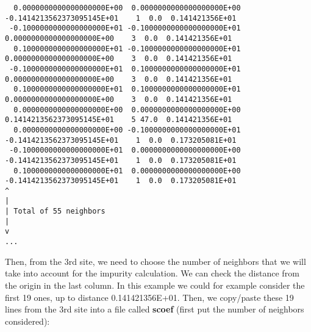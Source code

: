 \documentclass[a4paper,10pt,fullpage]{report}
\begin{document}
\begin{verbatim}
  0.0000000000000000000E+00  0.0000000000000000000E+00 -0.1414213562373095145E+01    1  0.0  0.141421356E+01
 -0.1000000000000000000E+01 -0.1000000000000000000E+01  0.0000000000000000000E+00    3  0.0  0.141421356E+01
  0.1000000000000000000E+01 -0.1000000000000000000E+01  0.0000000000000000000E+00    3  0.0  0.141421356E+01
 -0.1000000000000000000E+01  0.1000000000000000000E+01  0.0000000000000000000E+00    3  0.0  0.141421356E+01
  0.1000000000000000000E+01  0.1000000000000000000E+01  0.0000000000000000000E+00    3  0.0  0.141421356E+01
  0.0000000000000000000E+00  0.0000000000000000000E+00  0.1414213562373095145E+01    5 47.0  0.141421356E+01
  0.0000000000000000000E+00 -0.1000000000000000000E+01 -0.1414213562373095145E+01    1  0.0  0.173205081E+01
 -0.1000000000000000000E+01  0.0000000000000000000E+00 -0.1414213562373095145E+01    1  0.0  0.173205081E+01
  0.1000000000000000000E+01  0.0000000000000000000E+00 -0.1414213562373095145E+01    1  0.0  0.173205081E+01
^
|
| Total of 55 neighbors
|
v
...
\end{verbatim}
Then, from the 3rd site, we need to choose the number of neighbors that we will take into account
for the impurity calculation. 
We can check the distance from the origin in the last column. 
In this example we could for example consider
the first 19 ones, up to distance 0.141421356E+01.
Then, we copy/paste these 19 lines from the 3rd site into a file called \textbf{scoef}
(first put the number of neighbors considered):
\end{document}
